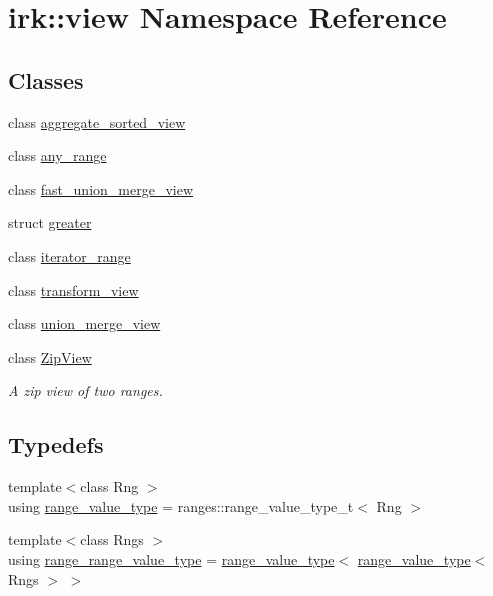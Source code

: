\hypertarget{namespaceirk_1_1view}{}\section{irk\+:\+:view Namespace Reference}
\label{namespaceirk_1_1view}
\subsection*{Classes}
\begin{DoxyCompactItemize}
\item 
class \mbox{\hyperlink{classirk_1_1view_1_1aggregate__sorted__view}{aggregate\+\_\+sorted\+\_\+view}}
\item 
class \mbox{\hyperlink{classirk_1_1view_1_1any__range}{any\+\_\+range}}
\item 
class \mbox{\hyperlink{classirk_1_1view_1_1fast__union__merge__view}{fast\+\_\+union\+\_\+merge\+\_\+view}}
\item 
struct \mbox{\hyperlink{structirk_1_1view_1_1greater}{greater}}
\item 
class \mbox{\hyperlink{classirk_1_1view_1_1iterator__range}{iterator\+\_\+range}}
\item 
class \mbox{\hyperlink{classirk_1_1view_1_1transform__view}{transform\+\_\+view}}
\item 
class \mbox{\hyperlink{classirk_1_1view_1_1union__merge__view}{union\+\_\+merge\+\_\+view}}
\item 
class \mbox{\hyperlink{classirk_1_1view_1_1ZipView}{Zip\+View}}
\begin{DoxyCompactList}\small\item\em A zip view of two ranges. \end{DoxyCompactList}\end{DoxyCompactItemize}
\subsection*{Typedefs}
\begin{DoxyCompactItemize}
\item 
{\footnotesize template$<$class Rng $>$ }\\using \mbox{\hyperlink{namespaceirk_1_1view_af4751010e3df5f2a3c2706fe12317fbd}{range\+\_\+value\+\_\+type}} = ranges\+::range\+\_\+value\+\_\+type\+\_\+t$<$ Rng $>$
\item 
{\footnotesize template$<$class Rngs $>$ }\\using \mbox{\hyperlink{namespaceirk_1_1view_a1b371e0a4f94ed45f210d4fa3643214a}{range\+\_\+range\+\_\+value\+\_\+type}} = \mbox{\hyperlink{namespaceirk_1_1view_af4751010e3df5f2a3c2706fe12317fbd}{range\+\_\+value\+\_\+type}}$<$ \mbox{\hyperlink{namespaceirk_1_1view_af4751010e3df5f2a3c2706fe12317fbd}{range\+\_\+value\+\_\+type}}$<$ Rngs $>$ $>$
\end{DoxyCompactItemize}
